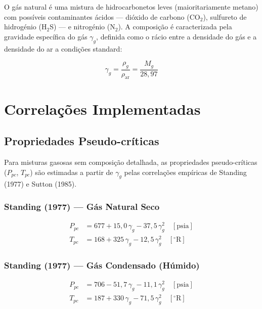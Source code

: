 \documentclass[12pt, a4paper]{article}
\begin{document}
O gás natural é uma mistura de hidrocarbonetos leves (maioritariamente metano) com
possíveis contaminantes ácidos — dióxido de carbono (CO$_2$), sulfureto de hidrogénio
(H$_2$S) — e nitrogénio (N$_2$). A composição é caracterizada pela gravidade específica
do gás $\gamma_g$, definida como o rácio entre a densidade do gás e a densidade do ar
a condições standard:

\begin{equation}\label{eq:gamma_g}
  \gamma_g = \frac{\rho_g}{\rho_{\text{ar}}} = \frac{M_g}{28{,}97}
\end{equation}

\section{Correlações Implementadas}

\subsection{Propriedades Pseudo-críticas}

Para misturas gasosas sem composição detalhada, as propriedades pseudo-críticas
($P_{pc}$, $T_{pc}$) são estimadas a partir de $\gamma_g$ pelas correlações
empíricas de Standing (1977) e Sutton (1985).

\subsubsection{Standing (1977) — Gás Natural Seco}

\begin{align}
  P_{pc} &= 677 + 15{,}0\,\gamma_g - 37{,}5\,\gamma_g^2
            \quad [\text{psia}] \label{eq:standing_seco_ppc}\\
  T_{pc} &= 168 + 325\,\gamma_g - 12{,}5\,\gamma_g^2
            \quad [^{\circ}\text{R}] \label{eq:standing_seco_tpc}
\end{align}

\subsubsection{Standing (1977) — Gás Condensado (Húmido)}

\begin{align}
  P_{pc} &= 706 - 51{,}7\,\gamma_g - 11{,}1\,\gamma_g^2
            \quad [\text{psia}] \\
  T_{pc} &= 187 + 330\,\gamma_g - 71{,}5\,\gamma_g^2
            \quad [^{\circ}\text{R}]
\end{align}
\end{document}
